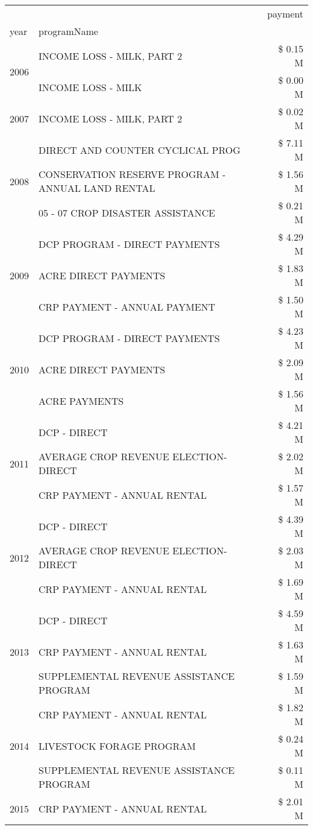 \begin{tabular}{llr}
\toprule
 &  & payment \\
year & programName &  \\
\midrule
\multirow[t]{2}{*}{2006} & INCOME LOSS - MILK, PART 2 & \$ 0.15 M \\
 & INCOME LOSS - MILK & \$ 0.00 M \\
\cline{1-3}
2007 & INCOME LOSS - MILK, PART 2 & \$ 0.02 M \\
\cline{1-3}
\multirow[t]{3}{*}{2008} & DIRECT AND COUNTER CYCLICAL PROG & \$ 7.11 M \\
 & CONSERVATION RESERVE PROGRAM - ANNUAL LAND RENTAL & \$ 1.56 M \\
 & 05 - 07 CROP DISASTER ASSISTANCE & \$ 0.21 M \\
\cline{1-3}
\multirow[t]{3}{*}{2009} & DCP PROGRAM - DIRECT PAYMENTS & \$ 4.29 M \\
 & ACRE DIRECT PAYMENTS & \$ 1.83 M \\
 & CRP PAYMENT - ANNUAL PAYMENT & \$ 1.50 M \\
\cline{1-3}
\multirow[t]{3}{*}{2010} & DCP PROGRAM - DIRECT PAYMENTS & \$ 4.23 M \\
 & ACRE DIRECT PAYMENTS & \$ 2.09 M \\
 & ACRE PAYMENTS & \$ 1.56 M \\
\cline{1-3}
\multirow[t]{3}{*}{2011} & DCP - DIRECT & \$ 4.21 M \\
 & AVERAGE CROP REVENUE ELECTION-DIRECT & \$ 2.02 M \\
 & CRP PAYMENT - ANNUAL RENTAL & \$ 1.57 M \\
\cline{1-3}
\multirow[t]{3}{*}{2012} & DCP - DIRECT & \$ 4.39 M \\
 & AVERAGE CROP REVENUE ELECTION-DIRECT & \$ 2.03 M \\
 & CRP PAYMENT - ANNUAL RENTAL & \$ 1.69 M \\
\cline{1-3}
\multirow[t]{3}{*}{2013} & DCP - DIRECT & \$ 4.59 M \\
 & CRP PAYMENT - ANNUAL RENTAL & \$ 1.63 M \\
 & SUPPLEMENTAL REVENUE ASSISTANCE PROGRAM & \$ 1.59 M \\
\cline{1-3}
\multirow[t]{3}{*}{2014} & CRP PAYMENT - ANNUAL RENTAL & \$ 1.82 M \\
 & LIVESTOCK FORAGE PROGRAM & \$ 0.24 M \\
 & SUPPLEMENTAL REVENUE ASSISTANCE PROGRAM & \$ 0.11 M \\
\cline{1-3}
\multirow[t]{3}{*}{2015} & CRP PAYMENT - ANNUAL RENTAL & \$ 2.01 M \\

\end{tabular}
